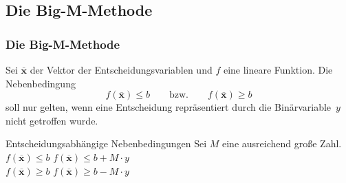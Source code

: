 \subsection{Die Big-M-Methode}
\begin{frame}
 \frametitle{Die Big-M-Methode}
 Sei $\mathbf{\overline{x}}$ der Vektor der Entscheidungsvariablen und $f$ eine lineare Funktion. Die Nebenbedingung
  \[
  f(\mathbf{\overline{x}}) \leq b\qquad\text{bzw.}\qquad f(\mathbf{\overline{x}}) \geq b
  \]
  soll nur gelten, wenn eine Entscheidung repräsentiert durch die Binärvariable~$y$ nicht getroffen wurde. 

  \begin{block}{Entscheidungsabhängige Nebenbedingungen}
  Sei $M$ eine ausreichend große Zahl.\\
  $f(\mathbf{\overline{x}}) \leq b$ \quad\textrightarrow{}\quad $f(\mathbf{\overline{x}}) \leq b + M\cdot y$\\
  $f(\mathbf{\overline{x}}) \geq b$ \quad\textrightarrow{}\quad $f(\mathbf{\overline{x}}) \geq b - M\cdot y$
\end{block}
\end{frame}

